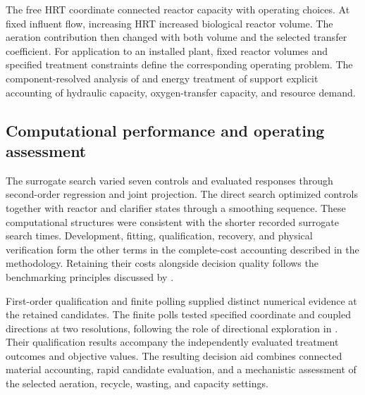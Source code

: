 The free HRT coordinate connected reactor capacity with operating choices. At fixed influent flow, increasing HRT increased biological reactor volume. The aeration contribution then changed with both volume and the selected transfer coefficient. For application to an installed plant, fixed reactor volumes and specified treatment constraints define the corresponding operating problem. The component-resolved analysis of \citet{Zhang2026} and energy treatment of \citet{Miederer2025} support explicit accounting of hydraulic capacity, oxygen-transfer capacity, and resource demand.

\subsection{Computational performance and operating assessment}

The surrogate search varied seven controls and evaluated responses through second-order regression and joint projection. The direct search optimized controls together with reactor and clarifier states through a smoothing sequence. These computational structures were consistent with the shorter recorded surrogate search times. Development, fitting, qualification, recovery, and physical verification form the other terms in the complete-cost accounting described in the methodology. Retaining their costs alongside decision quality follows the benchmarking principles discussed by \citet{Bliek2023}.

First-order qualification and finite polling supplied distinct numerical evidence at the retained candidates. The finite polls tested specified coordinate and coupled directions at two resolutions, following the role of directional exploration in \citet{AudetDennis2006}. Their qualification results accompany the independently evaluated treatment outcomes and objective values. The resulting decision aid combines connected material accounting, rapid candidate evaluation, and a mechanistic assessment of the selected aeration, recycle, wasting, and capacity settings.
